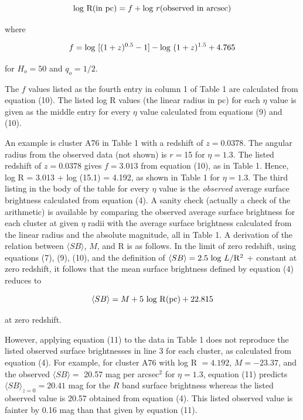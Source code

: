 \documentclass[preprint]{aastex}
\begin{document}
\begin{equation} 
  {\rm log~R(in~pc)} = f + {\rm log}~r ({\rm observed~in~arcsec})
\end{equation}

\noindent where 

\begin{equation}
   f =  {\rm log}~[(1 + z)^{0.5} - 1] - {\rm log}~(1 + z)^{1.5} + 4.765
\end{equation}

\noindent for $H_o = 50$ and $q_o = 1/2$.

The $f$ values listed as the fourth entry in column 1 of Table 1 are
calculated from equation (10). The listed log R values (the linear
radius in pc) for each $\eta$ value is given as the middle entry for
every $\eta$ value calculated from equations (9) and (10).

An example is cluster A76 in Table 1 with a redshift of $z =
0.0378$. The angular radius from the observed data (not shown) is $r =
$15 for $\eta = 1.3$. The listed redshift of $z = 0.0378$
gives $f = 3.013$ from equation (10), as in Table 1. Hence, log R =
3.013 + log (15.1) = 4.192, as shown in Table 1 for $\eta = 1.3$.  The
third listing in the body of the table for every $\eta$ value is the
{\it observed} average surface brightness calculated from equation
(4).  A sanity check (actually a check of the arithmetic) is available
by comparing the observed average surface brightness for each cluster
at given $\eta$ radii with the average surface brightness calculated
from the linear radius and the absolute magnitude, all in Table 1.  A
derivation of the relation between $\langle SB \rangle$, $M$, and R is
as follows. In the limit of zero redshift, using equations (7), (9),
(10), and the definition of $\langle SB \rangle = 2.5~{\rm log}~L/{\rm
R}^2$ + constant at zero redshift, it follows that the mean surface
brightness defined by equation (4) reduces to

\begin{equation}
              \langle SB \rangle = M + 5~{\rm log~R}({\rm pc}) + 22.815
\end{equation}

\noindent at zero redshift. 
     
However, applying equation (11) to the data in Table 1 does not
reproduce the listed observed surface brightnesses in line 3 for each
cluster, as calculated from equation (4). For example, for cluster A76
with log R $= 4.192$, $M = -23.37$, and the observed $\langle SB
\rangle =$ 20.57 mag per arcsec$^2$ for $\eta = 1.3$, equation (11)
predicts ${\langle SB \rangle}_{z=0} = 20.41$ mag for the $R$ band
surface brightness whereas the listed observed value is 20.57 obtained
from equation (4). This listed observed value is fainter by 0.16 mag
than that given by equation (11).
\end{document}
